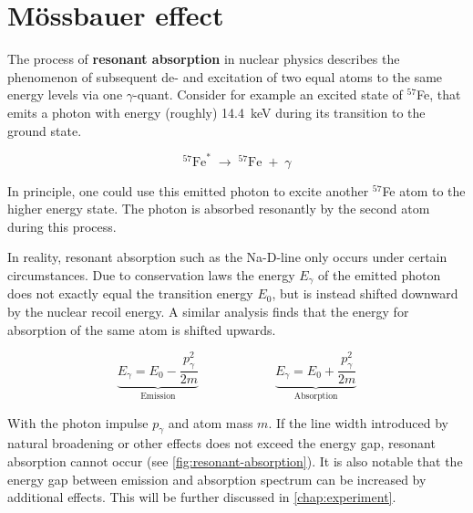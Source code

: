 
\section{Mössbauer effect}
\label{sec:mössbauer-effect}

The process of \textbf{resonant absorption} in nuclear physics describes the 
phenomenon of subsequent de- and excitation of two equal atoms to the same energy 
levels via one $\gamma$-quant. Consider for example an excited state of $^{57}$Fe,
that emits a photon with energy (roughly) \SI{14.4}{\kilo\electronvolt} during its 
transition to the ground state.

\begin{equation*}
^{57}\text{Fe}^*\;\longrightarrow\;^{57}\text{Fe}\;+\;\gamma  
\end{equation*}

In principle, one could use this emitted photon to excite another $^{57}$Fe atom to 
the higher energy state. The photon is absorbed resonantly by the second atom during 
this process.

In reality, resonant absorption such as the Na-D-line only occurs under certain
circumstances. Due to conservation laws the energy $E_\gamma$ of the emitted photon
does not exactly equal the transition energy $E_0$, but is instead shifted downward
by the nuclear recoil energy. A similar analysis finds that the energy for absorption
of the same atom is shifted upwards. 

\begin{equation}
\underbrace{E_\gamma = E_0 - \frac{p_\gamma^2}{2m}}_\text{Emission} \qquad\qquad\qquad \underbrace{E_\gamma = E_0 + \frac{p_\gamma^2}{2m}}_\text{Absorption}\label{eq:energy-gap}
\end{equation}

With the photon impulse $p_\gamma$ and atom mass $m$. If the line width introduced by
natural broadening or other effects does not exceed the energy gap, resonant 
absorption cannot occur (see \autoref{fig:resonant-absorption}). It is also notable 
that the energy gap between emission and absorption spectrum can be increased by 
additional effects. This will be further discussed in \autoref{chap:experiment}.

